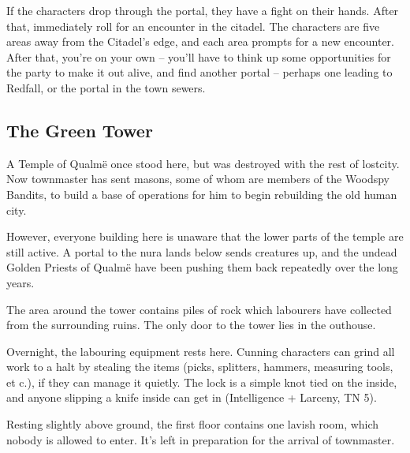 \begin{multicols}{2}
If the characters drop through the portal, they have a fight on their hands.  After that, immediately roll for an encounter in the citadel.  The characters are five areas away from the Citadel's edge, and each area prompts for a new encounter.  After that, you're on your own -- you'll have to think up some opportunities for the party to make it out alive, and find another portal -- perhaps one leading to Redfall, or the portal in the town sewers.

\subsection{The Green Tower}\label{green_tower}\setcounter{list}{0}

\begin{figure*}[t]

\label{green_tower_map}

\end{figure*}

A Temple of Qualm\"{e} once stood here, but was destroyed with the rest of \gls{lostcity}.
Now \gls{townmaster} has sent masons, some of whom are members of the Woodspy Bandits, to build a base of operations for him to begin rebuilding the old human city.

However, everyone building here is unaware that the lower parts of the temple are still active.
A portal to the nura lands below sends creatures up, and the undead Golden Priests of Qualm\"{e} have been pushing them back repeatedly over the long years.


The area around the tower contains piles of rock which labourers have collected from the surrounding ruins.  The only door to the tower lies in the outhouse.




Overnight, the labouring equipment rests here.  Cunning characters can grind all work to a halt by stealing the items (picks, splitters, hammers, measuring tools, et c.), if they can manage it quietly.  The lock is a simple knot tied on the inside, and anyone slipping a knife inside can get in (Intelligence + Larceny, TN 5).


Resting slightly above ground, the first floor contains one lavish room, which nobody is allowed to enter.  It's left in preparation for the arrival of \gls{townmaster}.


\end{multicols}
